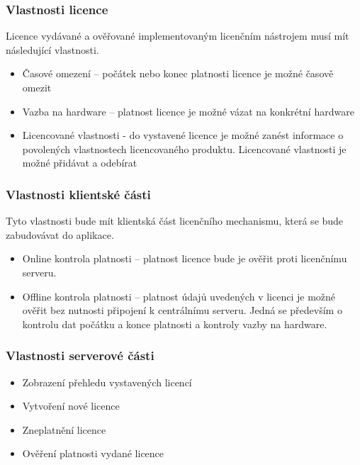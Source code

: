 \subsubsection*{Vlastnosti licence}

Licence vydávané a ověřované implementovaným licenčním nástrojem musí mít
následující vlastnosti.

\begin{itemize}
  \item Časové omezení – počátek nebo konec platnosti licence je možné časově
  omezit
  \item Vazba na hardware – platnost licence je možné vázat na konkrétní
  hardware
  \item Licencované vlastnosti - do vystavené licence je možné zanést
  informace o povolených vlastnostech licencovaného produktu. Licencované
  vlastnosti je možné přidávat a odebírat
\end{itemize}

\subsubsection*{Vlastnosti klientské části}

Tyto vlastnosti bude mít klientská část licenčního mechanismu, která se bude
zabudovávat do aplikace.

\begin{itemize}
  \item Online kontrola platnosti – platnost licence bude je ověřit proti
  licenčnímu serveru.
  \item Offline kontrola platnosti – platnost údajů uvedených v licenci je
  možné ověřit bez nutnosti připojení k centrálnímu serveru. Jedná se především
  o kontrolu dat počátku a konce platnosti a kontroly vazby na hardware.
\end{itemize}

\subsubsection*{Vlastnosti serverové části}

\begin{itemize}
  \item Zobrazení přehledu vystavených licencí
  \item Vytvoření nové licence
  \item Zneplatnění licence
  \item Ověření platnosti vydané licence
\end{itemize}

